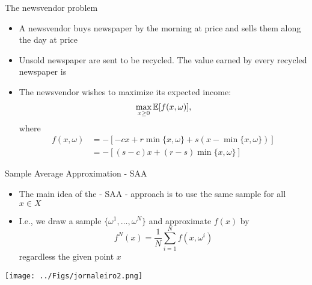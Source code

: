\begin{frame}{The newsvendor problem}

\begin{itemize}


\item A newsvendor buys newspaper  by the morning at price  and sells them along the day at price 
\pula

\item Unsold newspaper are sent to be recycled. The value earned by every recycled newspaper is 
\pula

\item The newsvendor wishes to maximize its expected income:
\[
\max_{x\geq 0} \mathbb{E}[f(x,\omega)],
\]
where
\[
\begin{array}{lll}
f(x,\omega) &= -[-cx + r\min\{x,\omega\} +  s(x - \min\{x,\omega\})]\\
&=
-[(s-c)x + (r-s)\min\{x,\omega\}]
\end{array}
\]
\end{itemize}

 \end{frame}












\begin{frame}{Sample Average Approximation - SAA}

\begin{itemize}
\item The main idea of the  - SAA - approach is to use the same sample for all $x \in X$
\pula

\item I.e., we draw a sample $\{\omega^1,\ldots, \omega^N\}$ and approximate $f(x)$ by
\[
f^N(x) = \frac{1}{N}\sum_{i=1}^N f(x,\omega^i)
\]
regardless the given point $x$
\end{itemize}
\begin{center}
\texttt{[image: ../Figs/jornaleiro2.png]} {}
\end{center}
 \end{frame}




